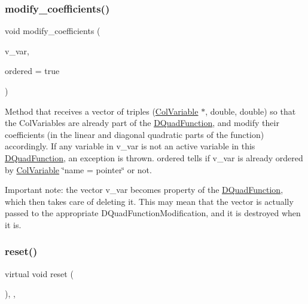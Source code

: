 \subsubsection{\texorpdfstring{modify\+\_\+coefficients()}{modify\_coefficients()}}
{\footnotesize\ttfamily void modify\+\_\+coefficients (\begin{DoxyParamCaption}\item[{\mbox{\hyperlink{class_s_m_spp__di__unipi__it_1_1_d_quad_function_adaced695e00a65836eb558a7bfbd85f4}{v\+\_\+var\+\_\+coeff\+\_\+coeff\+\_\+triple}} $\ast$}]{v\+\_\+var,  }\item[{const bool}]{ordered = {\ttfamily true} }\end{DoxyParamCaption})}

Method that receives a vector of triples (\mbox{\hyperlink{class_s_m_spp__di__unipi__it_1_1_col_variable}{Col\+Variable}} $\ast$, double, double) so that the Col\+Variables are already part of the \mbox{\hyperlink{class_s_m_spp__di__unipi__it_1_1_d_quad_function}{D\+Quad\+Function}}, and modify their coefficients (in the linear and diagonal quadratic parts of the function) accordingly. If any variable in v\+\_\+var is not an active variable in this \mbox{\hyperlink{class_s_m_spp__di__unipi__it_1_1_d_quad_function}{D\+Quad\+Function}}, an exception is thrown. ordered tells if v\+\_\+var is already ordered by \mbox{\hyperlink{class_s_m_spp__di__unipi__it_1_1_col_variable}{Col\+Variable}} \char`\"{}name = pointer\char`\"{} or not.

Important note\+: the vector v\+\_\+var becomes property of the \mbox{\hyperlink{class_s_m_spp__di__unipi__it_1_1_d_quad_function}{D\+Quad\+Function}}, which then takes care of deleting it. This may mean that the vector is actually passed to the appropriate D\+Quad\+Function\+Modification, and it is destroyed when it is. \mbox{\label{class_s_m_spp__di__unipi__it_1_1_d_quad_function_a7b0e029102ad38f4b814c6523aedb53d}} 
\subsubsection{\texorpdfstring{reset()}{reset()}}
{\footnotesize\ttfamily virtual void reset (\begin{DoxyParamCaption}{ }\end{DoxyParamCaption})\hspace{0.3cm}{\ttfamily [inline]}, {\ttfamily [protected]}, {\ttfamily [virtual]}}



